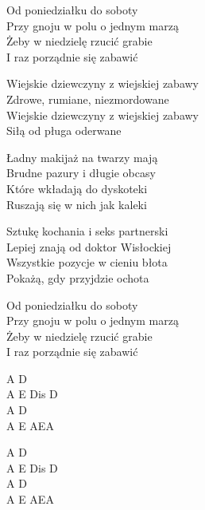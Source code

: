 \begin{text}
    Od poniedziałku do soboty\\
    Przy gnoju w polu o jednym marzą\\
    Żeby w niedzielę rzucić grabie\\
    I raz porządnie się zabawić

    \vin Wiejskie dziewczyny z wiejskiej zabawy\\
    \vin Zdrowe, rumiane, niezmordowane\\
    \vin Wiejskie dziewczyny z wiejskiej zabawy\\
    \vin Siłą od pługa oderwane

    Ładny makijaż na twarzy mają\\
    Brudne pazury i długie obcasy\\
    Które wkładają do dyskoteki\\
    Ruszają się w nich jak kaleki

    Sztukę kochania i seks partnerski\\
    Lepiej znają od doktor Wisłockiej\\
    Wszystkie pozycje w cieniu błota\\
    Pokażą, gdy przyjdzie ochota

    Od poniedziałku do soboty\\
    Przy gnoju w polu o jednym marzą\\
    Żeby w niedzielę rzucić grabie\\
    I raz porządnie się zabawić
\end{text}
\begin{chord}
    A D\\
    A E Dis D\\
    A D\\
    A E AEA

    A D\\
    A E Dis D\\
    A D\\
    A E AEA
\end{chord}